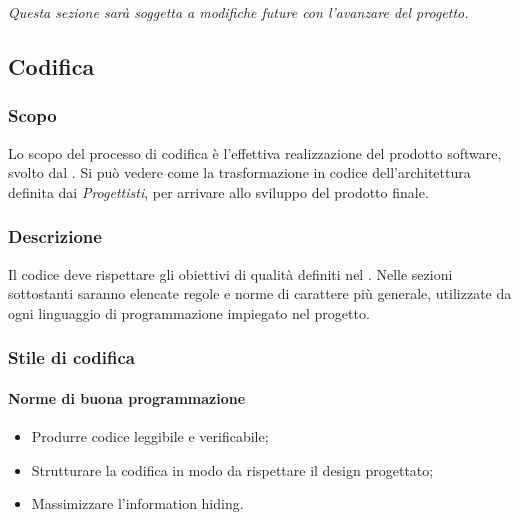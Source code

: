 \textit{Questa sezione sarà soggetta a modifiche future con l'avanzare del progetto.}

\subsection{Codifica}
\subsubsection{Scopo}
Lo scopo del processo di codifica è l’effettiva realizzazione del prodotto software, svolto dal \textit{\PR}. Si può vedere come la trasformazione in codice dell’architettura definita dai \textit{Progettisti}, per arrivare allo sviluppo del prodotto finale.

\subsubsection{Descrizione}
Il codice deve rispettare gli obiettivi di qualità definiti nel \PdQ. Nelle sezioni sottostanti saranno elencate regole e norme di carattere più generale, utilizzate da ogni linguaggio di programmazione impiegato nel progetto. 

\subsubsection{Stile di codifica}

\paragraph{Norme di buona programmazione}
\begin{itemize}
\item Produrre codice leggibile e verificabile;
\item Strutturare la codifica in modo da rispettare il design progettato;
\item Massimizzare l'information hiding.
\end{itemize}

